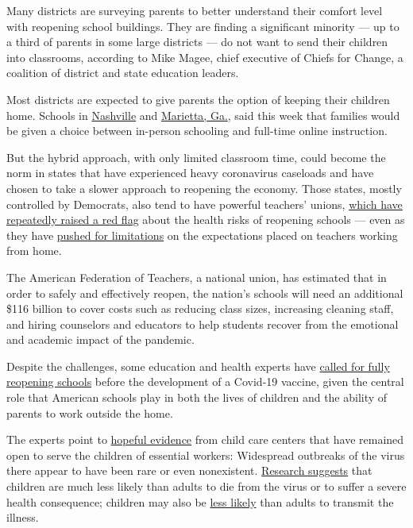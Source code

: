 Many districts are surveying parents to better understand their comfort
level with reopening school buildings. They are finding a significant
minority --- up to a third of parents in some large districts --- do not
want to send their children into classrooms, according to Mike Magee,
chief executive of Chiefs for Change, a coalition of district and state
education leaders.

Most districts are expected to give parents the option of keeping their
children home. Schools in
\href{https://www.tennessean.com/story/news/education/2020/06/26/metro-nashville-parents-have-choose-between-person-remote-learning-fall/3264076001/}{Nashville}
and \href{https://www.marietta-city.org/reopening}{Marietta, Ga.}, said
this week that families would be given a choice between in-person
schooling and full-time online instruction.

But the hybrid approach, with only limited classroom time, could become
the norm in states that have experienced heavy coronavirus caseloads and
have chosen to take a slower approach to reopening the economy. Those
states, mostly controlled by Democrats, also tend to have powerful
teachers' unions,
\href{https://www.nydailynews.com/opinion/ny-oped-teachers-will-return-in-the-fall-if-20200626-bu5nvsmx6zdqjfeppetepjnk2i-story.html}{which
have repeatedly raised a red flag} about the health risks of reopening
schools --- even as they have
\href{https://www.nytimes.com/2020/04/21/us/coronavirus-teachers-unions-school-home.html}{pushed
for limitations} on the expectations placed on teachers working from
home.

The American Federation of Teachers, a national union, has estimated
that in order to safely and effectively reopen, the nation's schools
will need an additional \$116 billion to cover costs such as reducing
class sizes, increasing cleaning staff, and hiring counselors and
educators to help students recover from the emotional and academic
impact of the pandemic.

Despite the challenges, some education and health experts have
\href{https://jamanetwork.com/journals/jamapediatrics/fullarticle/2766113}{called
for fully reopening schools} before the development of a Covid-19
vaccine, given the central role that American schools play in both the
lives of children and the ability of parents to work outside the home.

The experts point to
\href{https://www.npr.org/2020/06/24/882316641/what-parents-can-learn-from-child-care-centers-that-stayed-open-during-lockdowns}{hopeful
evidence} from child care centers that have remained open to serve the
children of essential workers: Widespread outbreaks of the virus there
appear to have been rare or even nonexistent.
\href{https://www.thelancet.com/journals/lanchi/article/PIIS2352-4642(20)30177-2/fulltext}{Research
suggests} that children are much less likely than adults to die from the
virus or to suffer a severe health consequence; children may also be
\href{http://ncirs.org.au/sites/default/files/2020-04/NCIRS\%20NSW\%20Schools\%20COVID_Summary_FINAL\%20public_26\%20April\%202020.pdf?fbclid=IwAR3oiRE3aeW_iDVBO8ilXa7VdkBMYLcV89pknobZx-cvtlumLQ-FSRwLEDg}{less
likely} than adults to transmit the illness.

